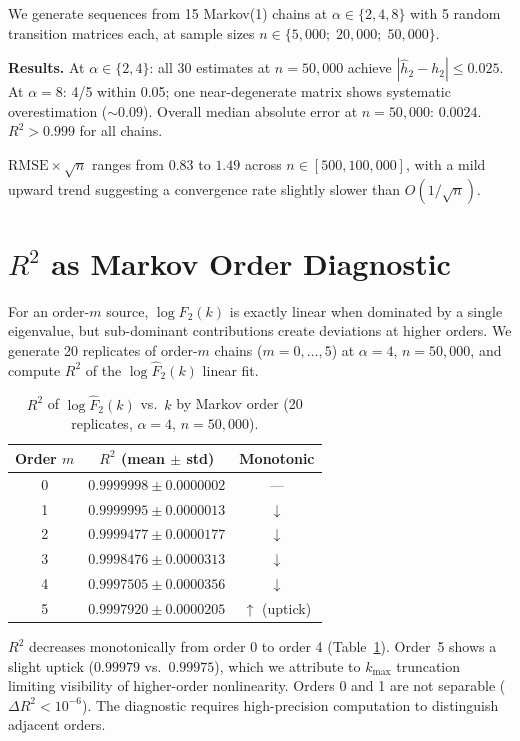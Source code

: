 \documentclass[conference]{IEEEtran}
\begin{document}
We generate sequences from 15 Markov(1) chains at $\alpha \in \{2, 4, 8\}$ with 5 random transition matrices each, at sample sizes $n \in \{5{,}000;\; 20{,}000;\; 50{,}000\}$.

\textbf{Results.} At $\alpha \in \{2, 4\}$: all 30 estimates at $n = 50{,}000$ achieve $|\hat{h}_2 - h_2| \leq 0.025$. At $\alpha = 8$: 4/5 within 0.05; one near-degenerate matrix shows systematic overestimation (${\sim}0.09$). Overall median absolute error at $n=50{,}000$: $0.0024$. $R^2 > 0.999$ for all chains.

$\mathrm{RMSE} \times \sqrt{n}$ ranges from $0.83$ to $1.49$ across $n \in [500, 100{,}000]$, with a mild upward trend suggesting a convergence rate slightly slower than $O(1/\sqrt{n})$.

\section{$R^2$ as Markov Order Diagnostic}
\label{sec:r2order}

For an order-$m$ source, $\log F_2(k)$ is exactly linear when dominated by a single eigenvalue, but sub-dominant contributions create deviations at higher orders. We generate 20 replicates of order-$m$ chains ($m = 0, \ldots, 5$) at $\alpha = 4$, $n = 50{,}000$, and compute $R^2$ of the $\log \hat{F}_2(k)$ linear fit.

\begin{table}[t]
\centering
\caption{$R^2$ of $\log \hat{F}_2(k)$ vs.\ $k$ by Markov order (20 replicates, $\alpha=4$, $n=50{,}000$).}
\label{tab:r2}
\begin{tabular}{ccc}
\toprule
Order $m$ & $R^2$ (mean $\pm$ std) & Monotonic \\
\midrule
0 & $0.9999998 \pm 0.0000002$ & --- \\
1 & $0.9999995 \pm 0.0000013$ & $\downarrow$ \\
2 & $0.9999477 \pm 0.0000177$ & $\downarrow$ \\
3 & $0.9998476 \pm 0.0000313$ & $\downarrow$ \\
4 & $0.9997505 \pm 0.0000356$ & $\downarrow$ \\
5 & $0.9997920 \pm 0.0000205$ & $\uparrow$ (uptick) \\
\bottomrule
\end{tabular}
\end{table}

$R^2$ decreases monotonically from order 0 to order 4 (Table~\ref{tab:r2}). Order~5 shows a slight uptick ($0.99979$ vs.\ $0.99975$), which we attribute to $k_{\max}$ truncation limiting visibility of higher-order nonlinearity. Orders 0 and 1 are not separable ($\Delta R^2 < 10^{-6}$). The diagnostic requires high-precision computation to distinguish adjacent orders.
\end{document}
